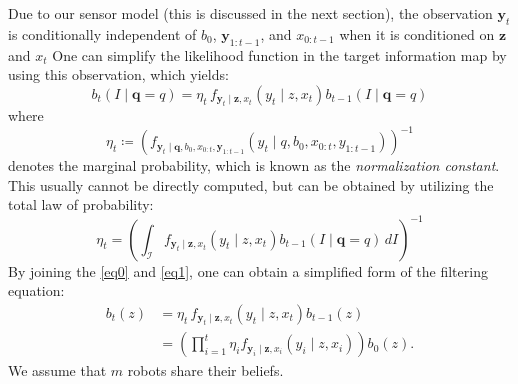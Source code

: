 \documentclass[letterpaper, 10 pt, conference]{ieeeconf}
\newcommand{\Ram}[1]{{\normalsize{\textbf{({\color{green}Ram:\ }#1)}}}}
\begin{document}
Due to our sensor model (this is discussed in the next section), the observation $\bm{y}_{t}$ is conditionally independent of $b_0$, $\bm{y}_{1:t-1}$, and $x_{0:t-1}$ when it is conditioned on $\bm{z}$ and $x_t$ 
One can simplify the likelihood function in the target information map by using this observation, which yields:
\begin{equation}
b_{t}(I \mid \bm{q} = q)=
\eta_t\,
	f_{\bm{y}_{t} \mid
		\bm{z},{x}_{t}}\left(
	y_{t} \mid
	z,{x}_{t}\right)
	b_{t-1}(I \mid \bm{q} = q)
	\label{eq1}
\end{equation}
where
\begin{equation}
\eta_{t} \coloneqq
\left(
	f_{\bm{y}_{t} \mid
	\bm{q},
	b_0,
	{x}_{0:t},\bm{y}_{1:t-1}	
}\left(
y_{t} \mid
q,b_0,
{x}_{0:t},y_{1:t-1}
\right)
\right)^{-1}
\nonumber
\end{equation}
denotes the marginal probability, which is known as the \emph{normalization constant}.
This usually cannot be directly computed, but can be obtained by utilizing the total law of probability:
\begin{equation}
\eta_{t} =
\left(\int_{\mathcal{I}}
f_{\bm{y}_{t} \mid
	\bm{z},{x}_{t}}\left(
y_{t} \mid
z,{x}_{t}\right)
b_{t-1}(I \mid \bm{q} = q)
\,dI\right)^{-1}
\end{equation}
By joining the \eqref{eq0} and \eqref{eq1}, one can obtain a simplified form of the filtering equation:
\begin{align}
b_t(z) &=
\eta_t\,
f_{\bm{y}_{t} \mid
	\bm{z},{x}_{t}}\left(
y_{t} \mid
z,{x}_{t}\right)
b_{t-1}(z)\\
&=\left(\prod_{i=1}^t
\eta_i
f_{\bm{y}_{i} \mid
	\bm{z},{x}_{i}}\left(
y_{i} \mid
z,{x}_{i}\right) \right)
b_0(z).
\end{align}
We assume that $m$ robots share their beliefs.
\end{document}
